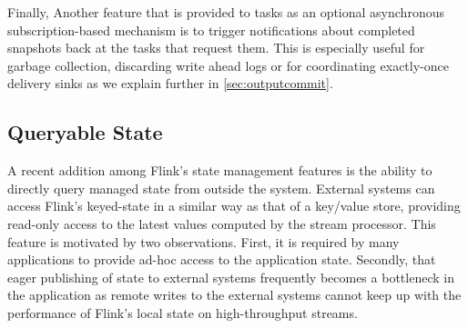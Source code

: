 
Finally, Another feature that is provided to tasks as an optional asynchronous subscription-based mechanism is to trigger notifications about completed snapshots back at the tasks that request them. This is especially useful for garbage collection, discarding write ahead logs or for coordinating exactly-once delivery sinks as we explain further in \autoref{sec:outputcommit}.

\subsection{Queryable State}

A recent addition among Flink's state management features is the ability to directly query managed state from outside the system. External systems can access Flink's keyed-state in a similar way as that of a key/value store, providing read-only access to the latest values computed by the stream processor. This feature is motivated by two observations. First, it is required by many applications to provide ad-hoc access to the application state. Secondly, that eager publishing of state to external systems frequently becomes a bottleneck in the application as remote writes to the external systems cannot keep up with the performance of Flink's local state on high-throughput streams.

